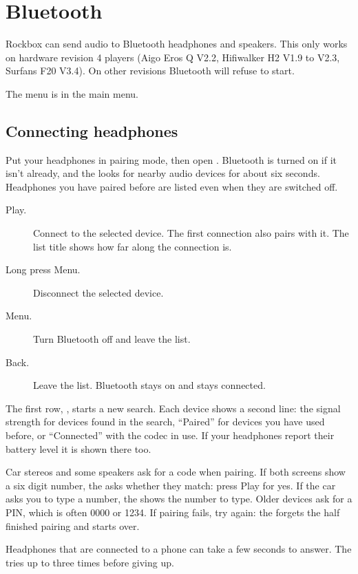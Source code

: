 \section{\label{ref:BluetoothSettings}Bluetooth}

Rockbox can send audio to Bluetooth headphones and speakers. This only works
on hardware revision 4 players (Aigo Eros Q V2.2, Hifiwalker H2 V1.9 to V2.3,
Surfans F20 V3.4). On other revisions Bluetooth will refuse to start.

The  menu is in the main  menu.

\subsection{Connecting headphones}
Put your headphones in pairing mode, then open . Bluetooth is
turned on if it isn't already, and the \dap{} looks for nearby audio devices
for about six seconds. Headphones you have paired before are listed even when
they are switched off.

\begin{description}
  \item[Play.] Connect to the selected device. The first connection also pairs
    with it. The list title shows how far along the connection is.
  \item[Long press Menu.] Disconnect the selected device.
  \item[Menu.] Turn Bluetooth off and leave the list.
  \item[Back.] Leave the list. Bluetooth stays on and stays connected.
\end{description}

The first row, , starts a new search. Each device shows a
second line: the signal strength for devices found in the search,
``Paired'' for devices you have used before, or ``Connected'' with the codec
in use. If your headphones report their battery level it is shown there too.

Car stereos and some speakers ask for a code when pairing. If both screens
show a six digit number, the \dap{} asks whether they match: press Play for
yes. If the car asks you to type a number, the \dap{} shows the number to
type. Older devices ask for a PIN, which is often 0000 or 1234. If pairing
fails, try again: the \dap{} forgets the half finished pairing and starts
over.

Headphones that are connected to a phone can take a few seconds to answer.
The \dap{} tries up to three times before giving up.

